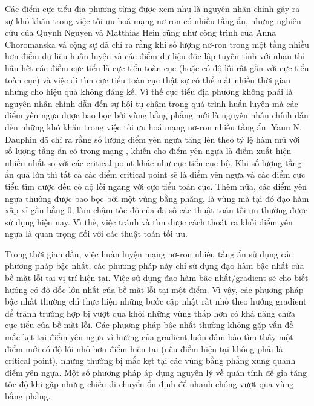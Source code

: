 Các điểm cực tiểu địa phương từng được xem như là nguyên nhân chính gây ra sự khó khăn trong việc tối ưu hoá mạng nơ-ron có nhiều tầng ẩn, nhưng nghiên cứu của Quynh Nguyen và Matthias Hein \cite{nguyen2017thelosssurface} cũng như công trình của Anna Choromanska và cộng sự \cite{choromanska2014thelosssurface} đã chỉ ra rằng khi số lượng nơ-ron trong một tầng nhiều hơn điểm dữ liệu huấn luyện và các điểm dữ liệu độc lập tuyến tính với nhau thì hầu hết các điểm cực tiểu là cực tiểu toàn cục (hoặc có độ lỗi rất gần với cực tiểu toàn cục) và việc đi tìm cực tiểu toàn cục thật sự có thể mất nhiều thời gian nhưng cho hiệu quả không đáng kể. Vì thế cực tiểu địa phương không phải là nguyên nhân chính dẫn đến sự hội tụ chậm trong quá trình huấn luyện mà các điểm yên ngựa được bao bọc bởi vùng bằng phẳng mới là nguyên nhân chính dẫn đến những khó khăn trong việc tối ưu hoá mạng nơ-ron nhiều tầng ẩn. Yann N. Dauphin đã chỉ ra rằng số lượng điểm yên ngựa tăng lên theo tỷ lệ hàm mũ với số lượng tầng ẩn có trong mạng \cite{dauphin2014identifying}, khiến cho điểm yên ngựa là điểm xuất hiện nhiều nhất so với các critical point khác như cực tiểu cục bộ. Khi số lượng tầng ẩn quá lớn thì tất cả các điểm critical point sẽ là điểm yên ngựa và các điểm cực tiểu tìm được đều có độ lỗi ngang với cực tiểu toàn cục. Thêm nữa, các điểm yên ngựa thường được bao bọc bởi một vùng bằng phẳng, là vùng mà tại đó đạo hàm xấp xỉ gần bằng 0, làm chậm tốc độ của đa số các thuật toán tối ưu thường được sử dụng hiện nay. Vì thế, việc tránh và tìm được cách thoát ra khỏi điểm yên ngựa là quan trọng đối với các thuật toán tối ưu.

Trong thời gian đầu, việc huấn luyện mạng nơ-ron nhiều tầng ẩn sử dụng các phương pháp bậc nhất, các phương pháp này chỉ sử dụng đạo hàm bậc nhất của bề mặt lỗi tại vị trí hiện tại. Việc sử dụng đạo hàm bậc nhất/gradient sẽ cho biết hướng có độ dốc lớn nhất của bề mặt lỗi tại một điểm. Vì vậy, các phương pháp bậc nhất thường chỉ thực hiện những bước cập nhật rất nhỏ theo hướng gradient để tránh trường hợp bị vượt qua khỏi những vùng thấp hơn có khả năng chứa cực tiểu của bề mặt lỗi. Các phương pháp bậc nhất thường không gặp vấn đề mắc kẹt tại điểm yên ngựa vì hướng của gradient luôn đảm bảo tìm thấy một điểm mới có độ lỗi nhỏ hơn điểm hiện tại (nếu điểm hiện tại không phải là critical point), nhưng thường bị mắc kẹt tại các vùng bằng phẳng xung quanh điểm yên ngựa. Một số phương pháp áp dụng nguyên lý về quán tính để gia tăng tốc độ khi gặp những chiều di chuyển ổn định để nhanh chóng vượt qua vùng bằng phẳng.

